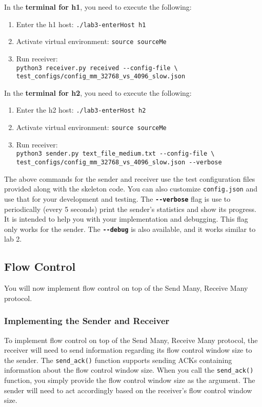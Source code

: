 \documentclass[11pt]{article}
\begin{document}
In the \textbf{terminal for h1}, you need to execute the following:
\begin{enumerate}
    \item Enter the h1 host: \texttt{./lab3-enterHost h1}
    \item Activate virtual environment: \texttt{source sourceMe}
    \item Run receiver:\\
    \texttt{python3 receiver.py received -{}-config-file \textbackslash\\ test\_configs/config\_mm\_32768\_vs\_4096\_slow.json}
\end{enumerate}

In the \textbf{terminal for h2}, you need to execute the following:
\begin{enumerate}
    \item Enter the h2 host: \texttt{./lab3-enterHost h2}
    \item Activate virtual environment: \texttt{source sourceMe}
    \item Run receiver: \\
    \texttt{python3 sender.py text\_file\_medium.txt -{}-config-file \textbackslash\\ test\_configs/config\_mm\_32768\_vs\_4096\_slow.json -{}-verbose}
\end{enumerate}

The above commands for the sender and receiver use the test configuration files provided along with the skeleton code. You can also customize \texttt{config.json} and use that for your development and testing. The \texttt{\textbf{-{}-verbose}} flag is use to periodically (every 5 seconds) print the sender's statistics and show its progress. It is intended to help you with your implementation and debugging. This flag only works for the sender. The \texttt{\textbf{-{}-debug}} is also available, and it works similar to lab 2.

\subsection{Flow Control}

You will now implement flow control on top of the Send Many, Receive Many protocol.

\subsubsection{Implementing the Sender and Receiver}
To implement flow control on top of the Send Many, Receive Many protocol, the receiver will need to send information regarding its flow control window size to the sender. The \texttt{send\_ack()} function supports sending ACKs containing information about the flow control window size. When you call the \texttt{send\_ack()} function, you simply provide the flow control window size as the argument. The sender will need to act accordingly based on the receiver's flow control window size.
\end{document}
